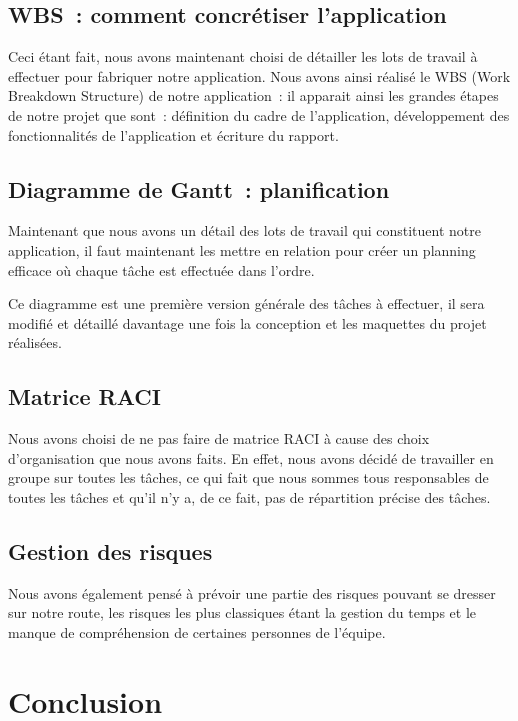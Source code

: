 \documentclass[french,a4paper]{article}
\begin{document}
    \subsection{WBS~: comment concrétiser l’application}
    Ceci étant fait, nous avons maintenant choisi de détailler les lots de travail à effectuer pour fabriquer notre application. Nous avons ainsi réalisé le WBS (Work Breakdown Structure) de notre application~: il apparait ainsi les grandes étapes de notre projet que sont~: définition du cadre de l’application, développement des fonctionnalités de l’application et écriture du rapport.


    \subsection{Diagramme de Gantt~: planification}
    Maintenant que nous avons un détail des lots de travail qui constituent notre application, il faut maintenant les mettre en relation pour créer un planning efficace où chaque tâche est effectuée dans l’ordre.

    Ce diagramme est une première version générale des tâches à effectuer, il sera modifié et détaillé davantage une fois la conception et les maquettes du projet réalisées.

    \subsection{Matrice RACI}
    Nous avons choisi de ne pas faire de matrice RACI à cause des choix d'organisation que nous avons faits. En effet,
    nous avons décidé de travailler en groupe sur toutes les tâches, ce qui fait que nous sommes tous responsables de toutes les tâches et qu'il n'y a, de ce fait,
    pas de répartition précise des tâches.

    \subsection{Gestion des risques}
    Nous avons également pensé à prévoir une partie des risques pouvant se dresser sur notre route, les risques les plus classiques étant
    la gestion du temps et le manque de compréhension de certaines personnes de l'équipe.


    \section{Conclusion}
\end{document}
